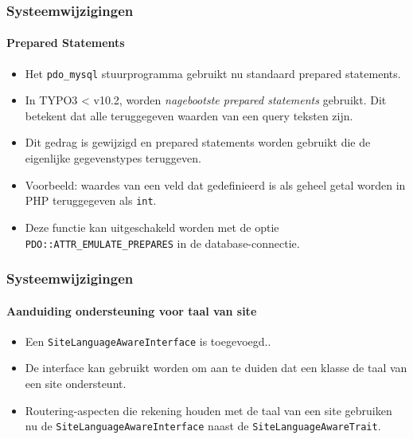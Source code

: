 \begin{frame}[fragile]
	\frametitle{Systeemwijzigingen}
	\framesubtitle{Prepared Statements}

	\lstset{basicstyle=\tiny\ttfamily}

	\begin{itemize}
		\item Het \texttt{pdo\_mysql} stuurprogramma gebruikt nu standaard prepared statements.
		\item In TYPO3 < v10.2, worden \textit{nagebootste prepared statements} gebruikt.
			Dit betekent dat alle teruggegeven waarden van een query teksten zijn.
		\item Dit gedrag is gewijzigd en prepared statements worden gebruikt
			die de eigenlijke gegevenstypes teruggeven.
		\item Voorbeeld: waardes van een veld dat gedefinieerd is als geheel getal worden in PHP
			teruggegeven als \texttt{int}.
		\item Deze functie kan uitgeschakeld worden met de optie
			\texttt{PDO::ATTR\_EMULATE\_PREPARES} in de database-connectie.

	\end{itemize}

\end{frame}


\begin{frame}[fragile]
	\frametitle{Systeemwijzigingen}
	\framesubtitle{Aanduiding ondersteuning voor taal van site}

	\lstset{basicstyle=\tiny\ttfamily}


	\begin{itemize}
		\item Een \texttt{SiteLanguageAwareInterface} is toegevoegd..
		\item De interface kan gebruikt worden om aan te duiden dat een klasse de taal
			van een site ondersteunt.
		\item Routering-aspecten die rekening houden met de taal van een site
			gebruiken nu de \texttt{SiteLanguageAwareInterface} naast
			de \texttt{SiteLanguageAwareTrait}.
	\end{itemize}

\end{frame}

